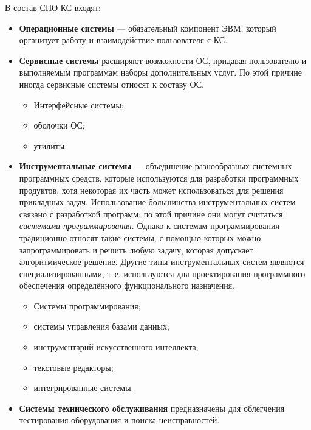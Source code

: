 \documentclass[a4paper, 10pt, notitlepage, pdftex,headsepline]{scrartcl}
\begin{document}
  В состав СПО КС входят:
  \begin{itemize}
    \item \textbf{Операционные системы} --- обязательный компонент ЭВМ, который
      организует работу и взаимодействие пользователя с КС.
    \item \textbf{Сервисные системы} расширяют возможности ОС, придавая
      пользователю и выполняемым программам наборы дополнительных услуг.
      По этой причине иногда сервисные системы относят к составу ОС.
      \begin{itemize}
        \item Интерфейсные системы;
        \item оболочки ОС;
        \item утилиты.
      \end{itemize}
    \item \textbf{Инструментальные системы} --- объединение разнообразных
      системных программных средств, которые используются для разработки
      программных продуктов, хотя некоторая их часть может
      использоваться для решения прикладных задач.
      Использование большинства инструментальных систем связано с
      разработкой программ; по этой причине они могут считаться
      \textit{системами программирования}.
      Однако к системам программирования традиционно относят такие
      системы, с помощью которых можно запрограммировать и решить любую
      задачу, которая допускает алгоритмическое решение.
      Другие типы инструментальных систем являются специализированными,
      т.\,е. используются для проектирования программного обеспечения
      определённого функционального назначения.
      \begin{itemize}
        \item Системы программирования;
        \item системы управления базами данных;
        \item инструментарий искусственного интеллекта;
        \item текстовые редакторы;
        \item интегрированные системы.
      \end{itemize}
    \item \textbf{Системы технического обслуживания} предназначены для
      облегчения тестирования оборудования и поиска неисправностей.
  \end{itemize}
\end{document}
